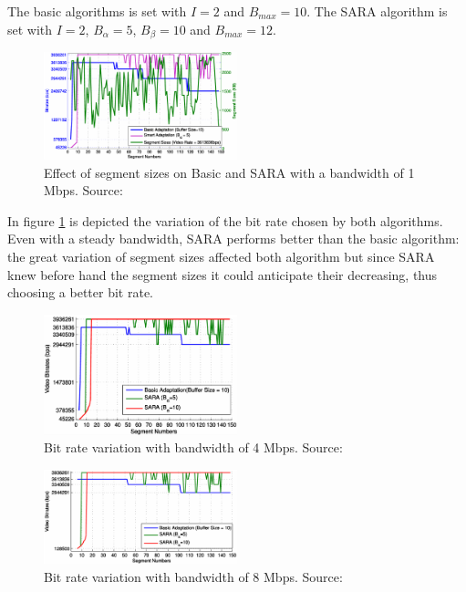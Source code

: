 \documentclass[openany]{book}
\begin{document}
The basic algorithms is set with $I=2$ and $B_{max}=10$. The SARA algorithm is set with $I=2$, $B_{\alpha}=5$, $B_{\beta}=10$ and $B_{max}=12$.

\begin{figure}[ht]
\centering
\includegraphics[width=0.5\textwidth]{sara_basic_segment}
\caption{Effect of segment sizes on Basic and SARA with a bandwidth of 1 Mbps. Source: \cite{SARA}}\label{fig:sarabasicseg}
\end{figure}

In figure \ref{fig:sarabasicseg} is depicted the variation of the bit rate chosen by both algorithms. Even with a steady bandwidth, SARA performs better than the basic algorithm: the great variation of segment sizes affected both algorithm but since SARA knew before hand the segment sizes it could anticipate their decreasing, thus choosing a better bit rate. 

\begin{figure}[ht!]
\centering
\includegraphics[width=0.5\textwidth]{sara_basic_4m}
\caption{Bit rate variation with bandwidth of 4 Mbps. Source: \cite{SARA}}\label{fig:sarabasic4m}
\end{figure}

\begin{figure}[ht!]
\centering
\includegraphics[width=0.5\textwidth]{sara_basic_8m}
\caption{Bit rate variation with bandwidth of 8 Mbps. Source: \cite{SARA}}\label{fig:sarabasic8m}
\end{figure}
\end{document}
